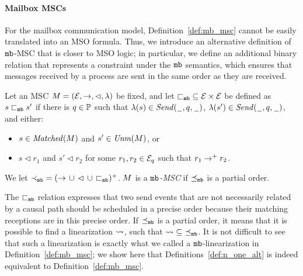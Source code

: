 \paragraph{\bf Mailbox MSCs}
For the mailbox communication model, Definition~\ref{def:mb_msc} cannot be easily translated into an MSO formula. Thus, we introduce an alternative definition of $\mathtt{mb}$-MSC that is closer to MSO logic; in particular, we define an additional binary relation that represents a constraint under the $\mathtt{mb}$ semantics, which ensures that messages received by a process are sent in the same order as they are received.

\begin{definition} \label{def:n_one_alt}
	Let an MSC $M = (\mathcal{E},\to,\lhd,\lambda)$ be fixed, and let ${\sqsubset_{\mathtt{mb}}} \subseteq \mathcal{E} \times \mathcal{E}$
	be defined as $s \sqsubset_{\mathtt{mb}} s'$ if there is $q \in \mathbb{P}$
	such that $\lambda(s) \in {\mathit{Send}(\hspace{0.1em}\underline{\hspace{0.5em}}\hspace{0.1em},q,\hspace{0.1em}\underline{\hspace{0.5em}}\hspace{0.1em})}$,
	$\lambda(s') \in {\mathit{Send}(\hspace{0.1em}\underline{\hspace{0.5em}}\hspace{0.1em},q,\hspace{0.1em}\underline{\hspace{0.5em}}\hspace{0.1em})}$, and either:
	\begin{itemize}%
		\item $s \in \mathit{Matched}(M)$ and $s' \in \mathit{Unm}(M)$, or
		\item $s \lhd r_1$ and $s' \lhd r_2$ for some $r_1,r_2 \in \mathcal{E}_q$ such that $r_1 \to^+ r_2$.
	\end{itemize}

	We let ${\prec_{\mathtt{mb}}} = ({\to} \,\cup\, {\lhd} \,\cup\, {\sqsubset_{\mathtt{mb}}})^+$.
	$M $ is a \emph{$\mathtt{mb}$-MSC}
	if ${\preceq_{\mathtt{mb}}}$ is a partial order.
\end{definition}
The ${\sqsubset_{\mathtt{mb}}}$ relation expresses that two send events that are not necessarily related by a causal path should be scheduled in a precise order because their matching receptions are in this precise order. If ${\preceq_{\mathtt{mb}}}$ is a partial order, it means that it is possible to find a linearization $\rightsquigarrow$, such that $\rightsquigarrow \;\subseteq\; \preceq_{\mathtt{mb}}$. It is not difficult to see that such a linearization is exactly what we called a $\mathtt{mb}$-linearization in Definition~\ref{def:mb_msc}; we show here that Definitions~\ref{def:n_one_alt} is indeed equivalent to Definition~\ref{def:mb_msc}.

